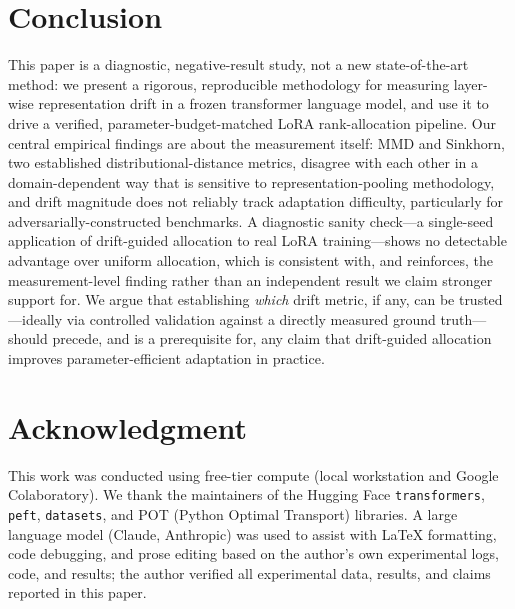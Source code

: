 \documentclass[conference]{IEEEtran}
\begin{document}
\section{Conclusion}

This paper is a diagnostic, negative-result study, not a new state-of-the-art method: we present a rigorous, reproducible methodology for measuring layer-wise representation drift in a frozen transformer language model, and use it to drive a verified, parameter-budget-matched LoRA rank-allocation pipeline. Our central empirical findings are about the measurement itself: MMD and Sinkhorn, two established distributional-distance metrics, disagree with each other in a domain-dependent way that is sensitive to representation-pooling methodology, and drift magnitude does not reliably track adaptation difficulty, particularly for adversarially-constructed benchmarks. A diagnostic sanity check---a single-seed application of drift-guided allocation to real LoRA training---shows no detectable advantage over uniform allocation, which is consistent with, and reinforces, the measurement-level finding rather than an independent result we claim stronger support for. We argue that establishing \emph{which} drift metric, if any, can be trusted---ideally via controlled validation against a directly measured ground truth---should precede, and is a prerequisite for, any claim that drift-guided allocation improves parameter-efficient adaptation in practice.

\section*{Acknowledgment}
This work was conducted using free-tier compute (local workstation and Google Colaboratory). We thank the maintainers of the Hugging Face \texttt{transformers}, \texttt{peft}, \texttt{datasets}, and POT (Python Optimal Transport) libraries. A large language model (Claude, Anthropic) was used to assist with LaTeX formatting, code debugging, and prose editing based on the author's own experimental logs, code, and results; the author verified all experimental data, results, and claims reported in this paper.



\end{document}
